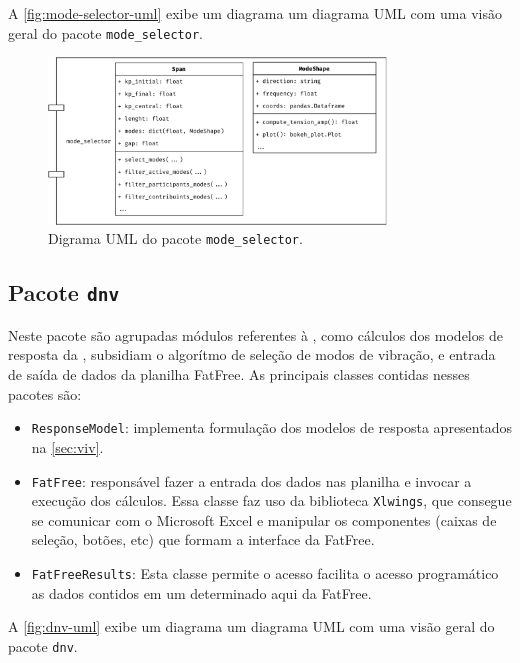 A \autoref{fig:mode-selector-uml} exibe um diagrama um diagrama UML com uma visão geral do pacote \texttt{mode\_selector}.

\begin{figure}[!ht]
    \centering
    \caption{Digrama UML do pacote \texttt{mode\_selector}.}\label{fig:mode-selector-uml}
    \includegraphics[width=0.8\textwidth]{imagens/mode-selector-uml}
\end{figure}


\subsection{Pacote \texttt{dnv}}

Neste pacote são agrupadas módulos referentes à , como cálculos dos modelos de resposta da , subsidiam o algorítmo de seleção de modos de vibração, e entrada de saída de dados da planilha FatFree. As principais classes contidas nesses pacotes são:

\begin{itemize}
    \item \texttt{ResponseModel}: implementa formulação dos modelos de resposta apresentados na \autoref{sec:viv}.

    \item \texttt{FatFree}: responsável fazer a entrada dos dados nas planilha e invocar a execução dos cálculos. Essa classe faz uso da biblioteca \texttt{Xlwings}, que consegue se comunicar com o Microsoft Excel e manipular os componentes (caixas de seleção, botões, etc) que formam a interface da FatFree.

    \item \texttt{FatFreeResults}: Esta classe permite o acesso facilita o acesso programático as dados contidos em um determinado aqui da FatFree.
\end{itemize}

A \autoref{fig:dnv-uml} exibe um diagrama um diagrama UML com uma visão geral do pacote \texttt{dnv}.

